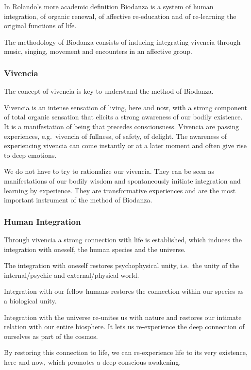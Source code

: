 \documentclass[
]{article}
\begin{document}
In Rolando's more academic definition Biodanza is a system of human integration, of organic renewal, of affective re-education and of re-learning the original functions of life.

The methodology of Biodanza consists of inducing integrating vivencia through music, singing, movement and encounters in an affective group.

\hypertarget{vivencia}{%
\subsubsection{Vivencia}\label{vivencia}}

The concept of vivencia is key to understand the method of Biodanza.

Vivencia is an intense sensation of living, here and now, with a strong component of total organic sensation that elicits a strong awareness of our bodily existence. It is a manifestation of being that precedes consciousness.
Vivencia are passing experiences, e.g.~vivencia of fullness, of safety, of delight.
The awareness of experiencing vivencia can come instantly or at a later moment and often give rise to deep emotions.

We do not have to try to rationalize our vivencia.
They can be seen as manifestations of our bodily wisdom and spontaneously initiate integration and learning by experience.
They are transformative experiences and are the most important instrument of the method of Biodanza.

\hypertarget{human-integration}{%
\subsubsection{Human Integration}\label{human-integration}}

Through vivencia a strong connection with life is established, which induces the integration with oneself, the human species and the universe.

The integration with oneself restores psychophysical unity, i.e.~the unity of the internal/psychic and external/physical world.

Integration with our fellow humans restores the connection within our species as a biological unity.

Integration with the universe re-unites us with nature and restores our intimate relation with our entire biosphere.
It lets us re-experience the deep connection of ourselves as part of the cosmos.

By restoring this connection to life, we can re-experience life to its very existence, here and now, which promotes a deep conscious awakening.
\end{document}
